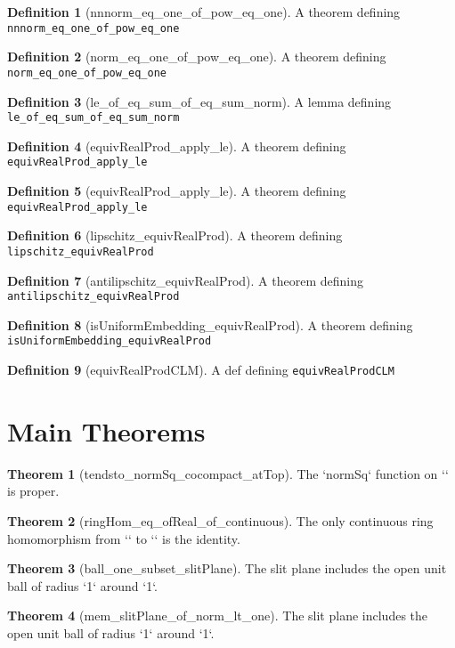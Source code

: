 \documentclass{article}
\theoremstyle{definition}
\newtheorem{definition}{Definition}
\newtheorem{theorem}{Theorem}
\begin{document}
\begin{definition}[nnnorm_eq_one_of_pow_eq_one]
A theorem defining \texttt{nnnorm_eq_one_of_pow_eq_one}
\end{definition}

\begin{definition}[norm_eq_one_of_pow_eq_one]
A theorem defining \texttt{norm_eq_one_of_pow_eq_one}
\end{definition}

\begin{definition}[le_of_eq_sum_of_eq_sum_norm]
A lemma defining \texttt{le_of_eq_sum_of_eq_sum_norm}
\end{definition}

\begin{definition}[equivRealProd_apply_le]
A theorem defining \texttt{equivRealProd_apply_le}
\end{definition}

\begin{definition}[equivRealProd_apply_le]
A theorem defining \texttt{equivRealProd_apply_le}
\end{definition}

\begin{definition}[lipschitz_equivRealProd]
A theorem defining \texttt{lipschitz_equivRealProd}
\end{definition}

\begin{definition}[antilipschitz_equivRealProd]
A theorem defining \texttt{antilipschitz_equivRealProd}
\end{definition}

\begin{definition}[isUniformEmbedding_equivRealProd]
A theorem defining \texttt{isUniformEmbedding_equivRealProd}
\end{definition}

\begin{definition}[equivRealProdCLM]
A def defining \texttt{equivRealProdCLM}
\end{definition}

\section{Main Theorems}
\begin{theorem}[tendsto_normSq_cocompact_atTop]
The `normSq` function on `` is proper.
\end{theorem}

\begin{theorem}[ringHom_eq_ofReal_of_continuous]
The only continuous ring homomorphism from `` to `` is the identity.
\end{theorem}

\begin{theorem}[ball_one_subset_slitPlane]
The slit plane includes the open unit ball of radius `1` around `1`.
\end{theorem}

\begin{theorem}[mem_slitPlane_of_norm_lt_one]
The slit plane includes the open unit ball of radius `1` around `1`.
\end{theorem}
\end{document}
